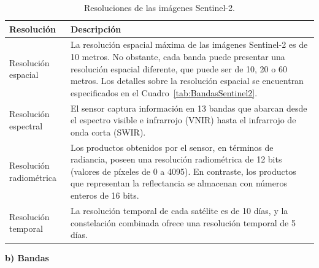 \begin{table}[H]
    \caption{Resoluciones de las imágenes Sentinel-2.}
    \small
    \begin{tabularx}{1\textwidth}{XX}
        \hline
        \textbf{Resolución}     & \textbf{Descripción}                                                                                                                                                                                                                                                                                    \\ \hline
        Resolución espacial     & La resolución espacial máxima de las imágenes Sentinel-2 es de 10 metros. No obstante, cada banda puede presentar una resolución espacial diferente, que puede ser de 10, 20 o 60 metros. Los detalles sobre la resolución espacial se encuentran especificados en el Cuadro~\ref{tab:BandasSentinel2}. \\ \hline
        Resolución espectral    & El sensor captura información en 13 bandas que abarcan desde el espectro visible e infrarrojo (VNIR) hasta el infrarrojo de onda corta (SWIR).                                                                                                                                                          \\ \hline
        Resolución radiométrica & Los productos obtenidos por el sensor, en términos de radiancia, poseen una resolución radiométrica de 12 bits (valores de píxeles de 0 a 4095). En contraste, los productos que representan la reflectancia se almacenan con números enteros de 16 bits.                                               \\ \hline
        Resolución temporal     & La resolución temporal de cada satélite es de 10 días, y la constelación combinada ofrece una resolución temporal de 5 días.                                                                                                                                                                            \\
    \end{tabularx}
    \begin{minipage}{\textwidth}
        \vspace{10pt}
        \label{tab:ResolucionesSentinel2}
    \end{minipage}
\end{table}

\textbf{b) Bandas}

